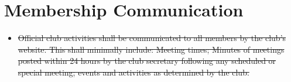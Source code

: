 \documentclass{article}
\begin{document}
{\color{red} 
\section{Membership Communication}
\begin{itemize}
\item \sout{ Official club activities shall be communicated to all members by the club's website.  This shall minimally include: Meeting times; Minutes of meetings posted within 24 hours by the club secretary following any scheduled or special meeting; events and activities as determined by the club.
}
\end{itemize}
}
\end{document}
